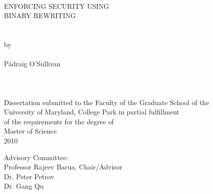 
\thispagestyle{empty}
\hbox{\ }
\vspace{1in}
\renewcommand{\baselinestretch}{1}
\small\normalsize
\begin{center}

\large{{ENFORCING SECURITY USING \\
BINARY REWRITING}}\\
\ \\
\ \\
\large{by} \\
\ \\
\large{P\'{a}draig O'Sullivan}%
\ \\
\ \\
\ \\
\ \\
\normalsize
Dissertation submitted to the Faculty of the Graduate School of the \\
University of Maryland, College Park in partial fulfillment \\
of the requirements for the degree of \\
Master of Science \\
2010
\end{center}

\vspace{7.5em}

\noindent Advisory Committee: \\
Professor Rajeev Barua, Chair/Advisor \\
Dr. Peter Petrov \\
Dr. Gang Qu
